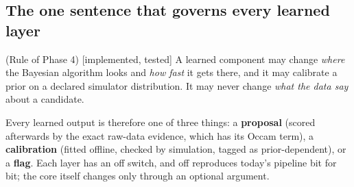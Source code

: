 \documentclass[11pt,a4paper]{article}
\theoremstyle{definition}
\newcommand{\badge}[2]{\textcolor{#1}{\textsf{\footnotesize[#2]}}}
\newcommand{\impl}{\badge{cC}{implemented, tested}}
\begin{document}
\subsection{The one sentence that governs every learned layer}
\begin{theorem}{(Rule of Phase 4) \impl}\label{thm:phase4}
A learned component may change \emph{where} the Bayesian algorithm looks and \emph{how fast} it gets there, and it may calibrate a prior on a declared simulator distribution. It may never change \emph{what the data say} about a candidate.
\end{theorem}
Every learned output is therefore one of three things: a \textbf{proposal} (scored afterwards by the exact raw-data evidence, which has its Occam term), a \textbf{calibration} (fitted offline, checked by simulation, tagged as prior-dependent), or a \textbf{flag}. Each layer has an off switch, and off reproduces today's pipeline bit for bit; the core itself changes only through an optional argument.
\end{document}
